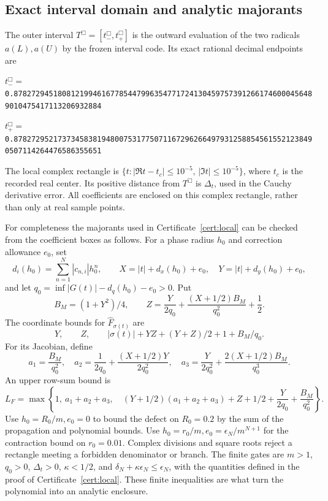 \subsection{Exact interval domain and analytic majorants}\label{app:intervalspec}
The outer interval \(T^\Box=[t^\Box_-,t^\Box_+]\) is the outward
evaluation of the two radicals \(a(L),a(U)\) by the frozen interval code.
Its exact rational decimal endpoints are
\begin{center}\footnotesize
\(t^\Box_-=\)\texttt{0.878272945180812199461677854479963547717241304597573912661746000456489010475417113206932884}
\par\smallskip
\(t^\Box_+=\)\texttt{0.878272952173734583819480075317750711672962664979312588545615521238490507114264476586355651}
\end{center}
The local complex rectangle is
\(\{t:|\Re t-t_c|\le10^{-5},\,|\Im t|\le10^{-5}\}\), where \(t_c\)
is the recorded real center. Its positive distance from \(T^\Box\)
is \(\Delta_t\), used in the Cauchy derivative error.
All coefficients are enclosed on this complex rectangle, rather than
only at real sample points.

For completeness the majorants used in Certificate~\ref{cert:local}
can be checked from the coefficient boxes as follows. For a phase
radius \(h_0\) and correction allowance \(e_0\), set
\[
 d_i(h_0)=\sum_{n=1}^N|c_{n,i}|h_0^n,\qquad
 X=|t|+d_x(h_0)+e_0,\quad Y=|t|+d_y(h_0)+e_0,
\]
and let \(q_0=\inf|G(t)|-d_q(h_0)-e_0>0\).
Put
\[
 B_M=(1+Y^2)/4,\qquad
 Z=\frac{Y}{2q_0}+\frac{(X+1/2)B_M}{q_0^2}+\frac12.
\]
The coordinate bounds for \(\widehat F_{\sigma(t)}\) are
\[
 Y,\qquad Z,\qquad
 |\sigma(t)|+YZ+(Y+Z)/2+1+B_M/q_0.
\]
For its Jacobian, define
\[
 a_1=\frac{B_M}{q_0^2},\quad
 a_2=\frac1{2q_0}+\frac{(X+1/2)Y}{2q_0^2},\quad
 a_3=\frac{Y}{2q_0^2}+\frac{2(X+1/2)B_M}{q_0^3}.
\]
An upper row-sum bound is
\[
 L_F=\max\left\{1,\ a_1+a_2+a_3,\quad
 (Y+1/2)(a_1+a_2+a_3)+Z+1/2+\frac{Y}{2q_0}
                                      +\frac{B_M}{q_0^2}\right\}.
\]
Use \(h_0=R_0/m,e_0=0\) to bound the defect on \(R_0=0.2\)
by the sum of the propagation and polynomial bounds. Use
\(h_0=r_0/m,e_0=\epsilon_N/m^{N+1}\) for the contraction bound
on \(r_0=0.01\). Complex divisions and square roots reject a
rectangle meeting a forbidden denominator or branch. The finite gates
are \(m>1\), \(q_0>0\), \(\Delta_t>0\), \(\kappa<1/2\), and
\(\delta_N+\kappa\epsilon_N\le\epsilon_N\), with the quantities defined
in the proof of Certificate~\ref{cert:local}. These finite inequalities
are what turn the polynomial into an analytic enclosure.


